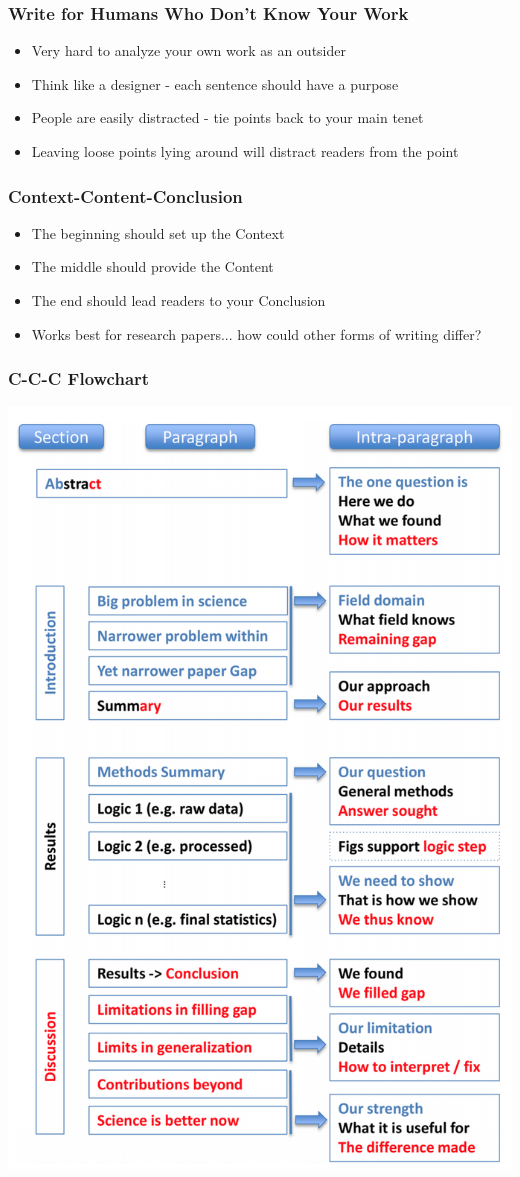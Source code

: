 \documentclass[14pt,handout]{beamer}
\begin{document}
\begin{frame}
\frametitle{Write for Humans Who Don't Know Your Work}
\begin{itemize}
	\item<+-> Very hard to analyze your own work as an outsider
	\item<+-> Think like a designer - each sentence should have a purpose
	\item<+-> People are easily distracted - tie points back to your main tenet
	\item<+-> Leaving loose points lying around will distract readers from the point
\end{itemize}
\end{frame}

\begin{frame}
\frametitle{Context-Content-Conclusion}
\begin{itemize}
	\item<+-> The beginning should set up the Context
	\item<+-> The middle should provide the Content
	\item<+-> The end should lead readers to your Conclusion
	\item<+-> Works best for research papers... how could other forms of writing differ?
\end{itemize}
\end{frame}

\begin{frame}
\frametitle{C-C-C Flowchart}
\begin{center}
	\includegraphics[width=.4\textwidth]{images_20171116_flowchart.png}
\end{center}
\end{frame}
\end{document}
